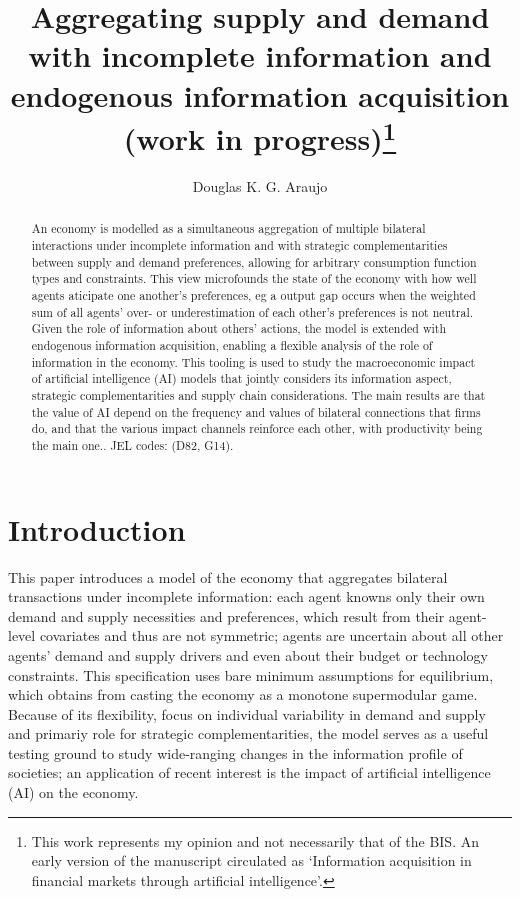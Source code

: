 \documentclass[
]{article}
\title{Aggregating supply and demand with incomplete information and
endogenous information acquisition (work in progress)\thanks{This work
represents my opinion and not necessarily that of the BIS. An early
version of the manuscript circulated as `Information acquisition in
financial markets through artificial intelligence'.}}
\author{Douglas K. G. Araujo}
\affil{%
                  Bank for International
Settlements, douglas.araujo@bis.org
              }
\date{}
\theoremstyle{definition}
\theoremstyle{plain}
\theoremstyle{remark}
\begin{document}
\maketitle
\begin{abstract}
An economy is modelled as a simultaneous aggregation of multiple
bilateral interactions under incomplete information and with strategic
complementarities between supply and demand preferences, allowing for
arbitrary consumption function types and constraints. This view
microfounds the state of the economy with how well agents aticipate one
another's preferences, eg a output gap occurs when the weighted sum of
all agents' over- or underestimation of each other's preferences is not
neutral. Given the role of information about others' actions, the model
is extended with endogenous information acquisition, enabling a flexible
analysis of the role of information in the economy. This tooling is used
to study the macroeconomic impact of artificial intelligence (AI) models
that jointly considers its information aspect, strategic
complementarities and supply chain considerations. The main results are
that the value of AI depend on the frequency and values of bilateral
connections that firms do, and that the various impact channels
reinforce each other, with productivity being the main one.. JEL codes:
(D82, G14).
\end{abstract}

\section{Introduction}\label{introduction}

This paper introduces a model of the economy that aggregates bilateral
transactions under incomplete information: each agent knowns only their
own demand and supply necessities and preferences, which result from
their agent-level covariates and thus are not symmetric; agents are
uncertain about all other agents' demand and supply drivers and even
about their budget or technology constraints. This specification uses
bare minimum assumptions for equilibrium, which obtains from casting the
economy as a monotone supermodular game. Because of its flexibility,
focus on individual variability in demand and supply and primariy role
for strategic complementarities, the model serves as a useful testing
ground to study wide-ranging changes in the information profile of
societies; an application of recent interest is the impact of artificial
intelligence (AI) on the economy.
\end{document}
